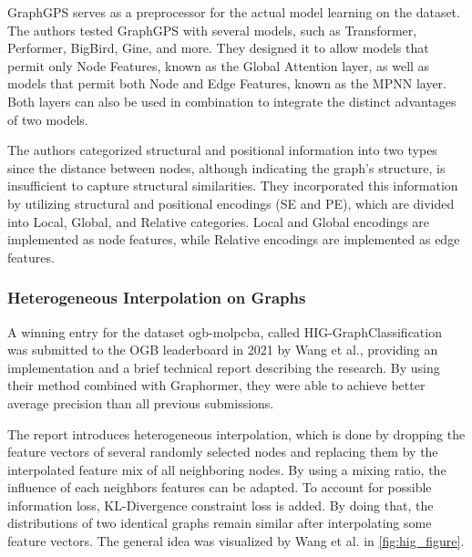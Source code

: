 GraphGPS serves as a preprocessor for the actual model learning on the dataset. The authors tested GraphGPS with several models, such as Transformer, Performer, BigBird, Gine, and more. They designed it to allow models that permit only Node Features, known as the Global Attention layer, as well as models that permit both Node and Edge Features, known as the MPNN layer. Both layers can also be used in combination to integrate the distinct advantages of two models.

The authors categorized structural and positional information into two types since the distance between nodes, although indicating the graph's structure, is insufficient to capture structural similarities. They incorporated this information by utilizing structural and positional encodings (SE and PE), which are divided into Local, Global, and Relative categories. Local and Global encodings are implemented as node features, while Relative encodings are implemented as edge features.

\subsubsection{Heterogeneous Interpolation on Graphs}
A winning entry for the dataset ogb-molpcba, called HIG-GraphClassification~\cite{tencenc2021Hig,tencenc2021HigPaper} was submitted to the OGB leaderboard in 2021 by Wang et al., providing an implementation and a brief technical report describing the research. By using their method combined with Graphormer, they were able to achieve better average precision than all previous submissions.

The report introduces heterogeneous interpolation, which is done by dropping the feature vectors of several randomly selected nodes and replacing them by the interpolated feature mix of all neighboring nodes.
By using a mixing ratio, the influence of each neighbors features can be adapted. To account for possible information loss, KL-Divergence constraint loss is added. By doing that, the distributions of two identical graphs remain similar after interpolating some feature vectors. The general idea was visualized by Wang et al. in \autoref{fig:hig_figure}.

